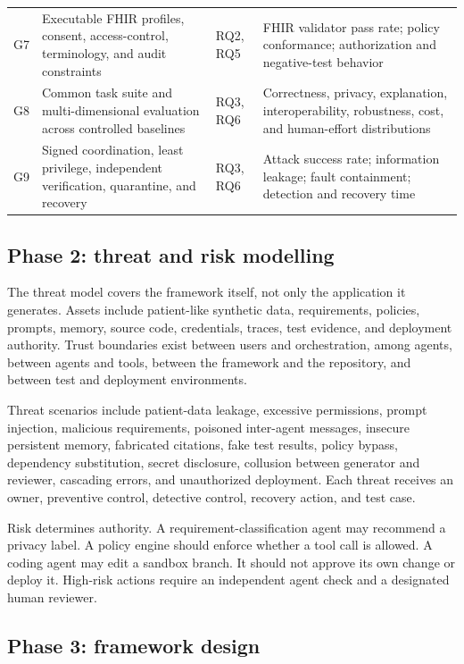\documentclass[11pt,a4paper]{article}
\begin{document}
\begin{longtable}{L{0.75cm}L{4.15cm}L{2.15cm}L{6.20cm}}
G7 & Executable FHIR profiles, consent, access-control, terminology, and audit constraints & RQ2, RQ5 & FHIR validator pass rate; policy conformance; authorization and negative-test behavior \\
G8 & Common task suite and multi-dimensional evaluation across controlled baselines & RQ3, RQ6 & Correctness, privacy, explanation, interoperability, robustness, cost, and human-effort distributions \\
G9 & Signed coordination, least privilege, independent verification, quarantine, and recovery & RQ3, RQ6 & Attack success rate; information leakage; fault containment; detection and recovery time \\
\end{longtable}
\normalsize

\subsection{Phase 2: threat and risk modelling}

The threat model covers the framework itself, not only the application it generates. Assets include patient-like synthetic data, requirements, policies, prompts, memory, source code, credentials, traces, test evidence, and deployment authority. Trust boundaries exist between users and orchestration, among agents, between agents and tools, between the framework and the repository, and between test and deployment environments.

Threat scenarios include patient-data leakage, excessive permissions, prompt injection, malicious requirements, poisoned inter-agent messages, insecure persistent memory, fabricated citations, fake test results, policy bypass, dependency substitution, secret disclosure, collusion between generator and reviewer, cascading errors, and unauthorized deployment. Each threat receives an owner, preventive control, detective control, recovery action, and test case.

Risk determines authority. A requirement-classification agent may recommend a privacy label. A policy engine should enforce whether a tool call is allowed. A coding agent may edit a sandbox branch. It should not approve its own change or deploy it. High-risk actions require an independent agent check and a designated human reviewer.

\subsection{Phase 3: framework design}
\end{document}
